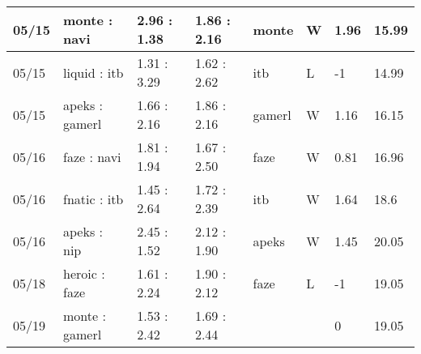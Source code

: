 \begin{small}
\begin{longtable}{|l|l|l|l|l|l|l|l|}
	05/15                               & monte : navi                        & 2.96 : 1.38                             & 1.86 : 2.16                             & monte                             & W                                 & 1.96                                 & 15.99                             \\ \hline
	05/15                               & liquid : itb                        & 1.31 : 3.29                             & 1.62 : 2.62                             & itb                               & L                                 & -1                                   & 14.99                             \\ \hline
	05/15                               & apeks : gamerl                      & 1.66 : 2.16                             & 1.86 : 2.16                             & gamerl                            & W                                 & 1.16                                 & 16.15                             \\ \hline
	05/16                               & faze : navi                         & 1.81 : 1.94                             & 1.67 : 2.50                             & faze                              & W                                 & 0.81                                 & 16.96                             \\ \hline
	05/16                               & fnatic : itb                        & 1.45 : 2.64                             & 1.72 : 2.39                             & itb                               & W                                 & 1.64                                 & 18.6                              \\ \hline
	05/16                               & apeks : nip                         & 2.45 : 1.52                             & 2.12 : 1.90                             & apeks                             & W                                 & 1.45                                 & 20.05                             \\ \hline
	05/18                               & heroic : faze                       & 1.61 : 2.24                             & 1.90 : 2.12                             & faze                              & L                                 & -1                                   & 19.05                             \\ \hline
	05/19                               & monte : gamerl                      & 1.53 : 2.42                             & 1.69 : 2.44                             &                                   &                                   & 0                                    & 19.05                             \\ \hline

\end{longtable}
\end{small}
